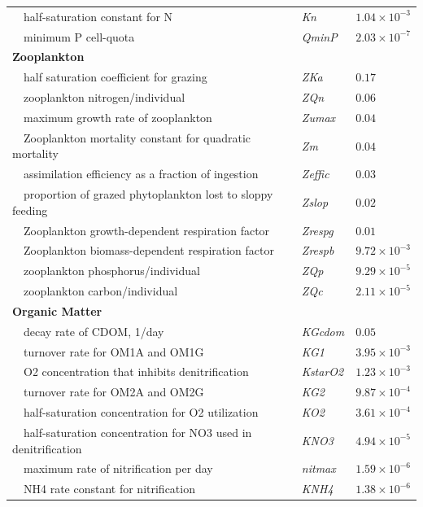 \documentclass[letterpaper,12pt,oneside]{article}\usepackage[]{graphicx}\usepackage[]{color}
\begin{document}
\begin{table}[!tbp]
{\begin{center}
\begin{tabular}{lll}
~~half-saturation constant for N&\textit{Kn}&$1.04\times 10^{-3}$\tabularnewline
~~minimum P cell-quota&\textit{QminP}&$2.03\times 10^{-7}$\tabularnewline
\hline
{\bfseries Zooplankton}&&\tabularnewline
~~half saturation coefficient for grazing&\textit{ZKa}&$0.17$\tabularnewline
~~zooplankton nitrogen/individual&\textit{ZQn}&$0.06$\tabularnewline
~~maximum growth rate of zooplankton&\textit{Zumax}&$0.04$\tabularnewline
~~Zooplankton mortality constant for quadratic mortality&\textit{Zm}&$0.04$\tabularnewline
~~assimilation efficiency as a fraction of ingestion&\textit{Zeffic}&$0.03$\tabularnewline
~~proportion of grazed phytoplankton lost to sloppy feeding&\textit{Zslop}&$0.02$\tabularnewline
~~Zooplankton growth-dependent respiration factor&\textit{Zrespg}&$0.01$\tabularnewline
~~Zooplankton biomass-dependent respiration factor&\textit{Zrespb}&$9.72\times 10^{-3}$\tabularnewline
~~zooplankton phosphorus/individual&\textit{ZQp}&$9.29\times 10^{-5}$\tabularnewline
~~zooplankton carbon/individual&\textit{ZQc}&$2.11\times 10^{-5}$\tabularnewline
\hline
{\bfseries Organic Matter}&&\tabularnewline
~~decay rate of CDOM, 1/day&\textit{KGcdom}&$0.05$\tabularnewline
~~turnover rate for OM1A and OM1G&\textit{KG1}&$3.95\times 10^{-3}$\tabularnewline
~~O2 concentration that inhibits denitrification&\textit{KstarO2}&$1.23\times 10^{-3}$\tabularnewline
~~turnover rate for OM2A and OM2G&\textit{KG2}&$9.87\times 10^{-4}$\tabularnewline
~~half-saturation concentration for O2 utilization&\textit{KO2}&$3.61\times 10^{-4}$\tabularnewline
~~half-saturation concentration for NO3 used in denitrification&\textit{KNO3}&$4.94\times 10^{-5}$\tabularnewline
~~maximum rate of nitrification per day&\textit{nitmax}&$1.59\times 10^{-6}$\tabularnewline
~~NH4 rate constant for nitrification&\textit{KNH4}&$1.38\times 10^{-6}$\tabularnewline
\hline
\end{tabular}\end{center}}

\end{table}
\end{document}
